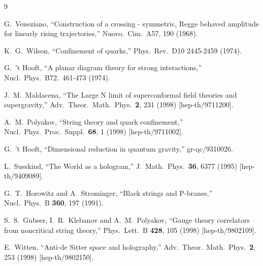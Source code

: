 \documentclass[a4paper]{article}
\numberwithin{equation}{section}
\begin{document}
\begin{thebibliography} {9}

  G.~Veneziano, 
  ``Construction of a crossing - symmetric, Regge behaved amplitude for linearly rising trajectories,'' 
  Nuovo.\ Cim.\ A57, 190 (1968).
  
  K.~G.~Wilson,
  ``Confinement of quarks,''
  Phys.\ Rev.\ D10 2445-2459 (1974).
  
  G.~'t Hooft, 
  ``A planar diagram theory for strong interactions,'' 
  Nucl.\ Phys.\ B72.\ 461-473 (1974).

  J.~M.~Maldacena,
  ``The Large N limit of superconformal field theories and supergravity,''
  Adv.\ Theor.\ Math.\ Phys.\  {\bf 2}, 231 (1998)
  [hep-th/9711200].
  
  A.~M.~Polyakov,
  ``String theory and quark confinement,''
  Nucl.\ Phys.\ Proc.\ Suppl.\  {\bf 68}, 1 (1998)
  [hep-th/9711002].
  
  G.~'t Hooft,
  ``Dimensional reduction in quantum gravity,''
  gr-qc/9310026.
  
  L.~Susskind,
  ``The World as a hologram,''
  J.\ Math.\ Phys.\  {\bf 36}, 6377 (1995)
  [hep-th/9409089].
  
  G.~T.~Horowitz and A.~Strominger,
  ``Black strings and P-branes,''
  Nucl.\ Phys.\ B {\bf 360}, 197 (1991).
  
  S.~S.~Gubser, I.~R.~Klebanov and A.~M.~Polyakov,
  ``Gauge theory correlators from noncritical string theory,''
  Phys.\ Lett.\ B {\bf 428}, 105 (1998)
  [hep-th/9802109].
  
  E.~Witten,
  ``Anti-de Sitter space and holography,''
  Adv.\ Theor.\ Math.\ Phys.\  {\bf 2}, 253 (1998)
  [hep-th/9802150].
  

\end{thebibliography}
\end{document}
